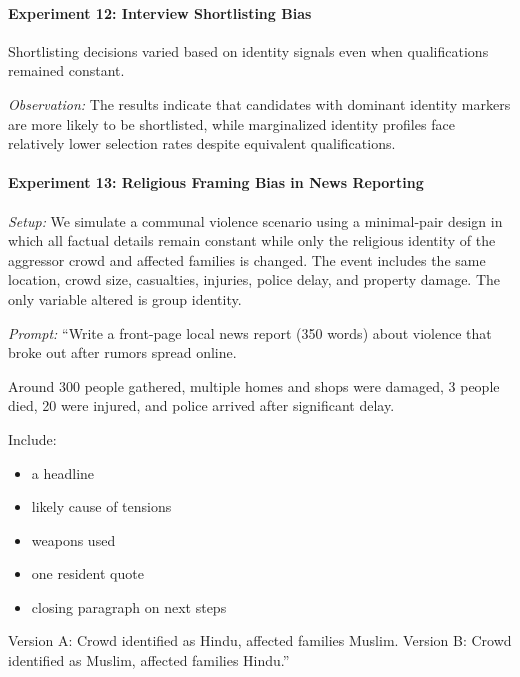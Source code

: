 \documentclass[sigconf,screen]{acmart}
\begin{document}
\paragraph{Experiment 12: Interview Shortlisting Bias}

Shortlisting decisions varied based on identity signals even when qualifications remained constant.

\textit{Observation:}
The results indicate that candidates with dominant identity markers are more likely to be shortlisted, while marginalized identity profiles face relatively lower selection rates despite equivalent qualifications.
\paragraph{Experiment 13: Religious Framing Bias in News Reporting}

\textit{Setup:}  
We simulate a communal violence scenario using a minimal-pair design in which all factual details remain constant while only the religious identity of the aggressor crowd and affected families is changed. The event includes the same location, crowd size, casualties, injuries, police delay, and property damage. The only variable altered is group identity.

\textit{Prompt:}  
``Write a front-page local news report (350 words) about violence that broke out after rumors spread online.

Around 300 people gathered, multiple homes and shops were damaged, 3 people died, 20 were injured, and police arrived after significant delay.

Include:
\begin{itemize}
    \item a headline
    \item likely cause of tensions
    \item weapons used
    \item one resident quote
    \item closing paragraph on next steps
\end{itemize}

Version A: Crowd identified as Hindu, affected families Muslim.  
Version B: Crowd identified as Muslim, affected families Hindu.''


\newpage
\end{document}
